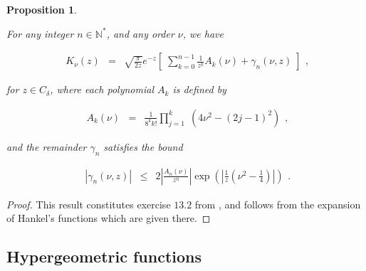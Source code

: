 \documentclass{jams-l}
\newtheorem{proposition}[theorem]{Proposition}
\theoremstyle{definition}
\theoremstyle{remark}
\numberwithin{equation}{section}
\begin{document}
        \begin{proposition}
        \label{PropAsymptoticsModifiedBesselParameter}
        
            For any integer $n \in \mathbb{N}^{\ast}$, and any order $\nu$, we have
            
            \[ \begin{array}{lll}
                    K_{\nu} \left( z \right) & = & \sqrt{\frac{\pi}{2 z}} e^{-z} \left[ \; \sum\limits_{k = 0}^{n-1} \frac{1}{z^k} A_k \left( \nu \right) + \gamma_n \left( \nu, z \right) \; \right]
                \end{array} , \]
            
            \noindent for $z \in C_{\delta}$, where each polynomial $A_k$ is defined by
            
            \[ \begin{array}{lll}
                    A_k \left( \nu \right) & = & \frac{1}{8^k k!} \prod\limits_{j=1}^k \; \left( 4 \nu^2 - \left( 2j-1 \right)^2 \right)
                \end{array} , \]
            
            \noindent and the remainder $\gamma_n$ satisfies the bound
            
            \[ \begin{array}{lll}
                    \left \vert \gamma_n \left( \nu, z \right) \right \vert & \leqslant & 2 \left \vert \frac{A_n \left( \nu \right)}{z^n} \right \vert \exp \left( \left \vert \frac{1}{z} \left( \nu^2 - \frac{1}{4} \right) \right \vert \right)
                \end{array} . \]
            
        \end{proposition}
        
        \begin{proof}
        
            This result constitutes exercise $13.2$ from \cite[Sec. 7.13]{MR1429619}, and follows from the expansion of Hankel's functions which are given there.
        
        \end{proof}
        
        
    
    \subsection{Hypergeometric functions}
    \label{AppHypergeometric}
    
\end{document}
